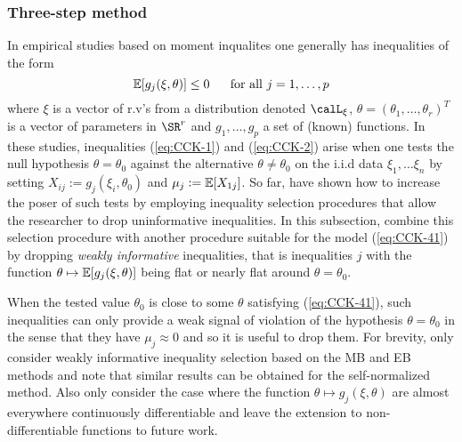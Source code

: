 \subsubsection{Three-step method} 

In empirical studies based on moment inqualites one generally has inequalities of the form 
\begin{equation}
	\label{eq:CCK-41}
	\mathbb{E}[g_j(\xi, \theta)]\leq 0\hbox{ }\hbox{ }\hbox{ }\hbox{ }\text{ for all }j = 1,\dots,p
\end{equation}
where $\xi$ is a vector of r.v's from a distribution denoted $\calL_\xi$, $\theta = (\theta_1, \dots, \theta_r)^T$ is a vector of parameters in $\SR^r$ and $g_1,\dots,g_p$ a set of (known) functions. In these studies, inequalities (\ref{eq:CCK-1}) and (\ref{eq:CCK-2}) arise when one tests the null hypothesis $\theta = \theta_0$ against the alternative $\theta \neq \theta_0$ on the i.i.d data $\xi_1,\dots \xi_n$ by setting $X_{ij} := g_j(\xi_i,\theta_0)$ and $\mu_j := \mathbb{E}[X_{1j}]$. So far, have shown how to increase the poser of such tests by employing inequality selection procedures that allow the researcher to drop uninformative inequalities. In this subsection, combine this selection procedure with another procedure suitable for the model (\ref{eq:CCK-41}) by dropping \textit{weakly informative} inequalities, that is inequalities $j$ with the function $\theta \mapsto \mathbb{E}[g_j(\xi,\theta)]$ being flat or nearly flat around $\theta = \theta_0$. 

When the tested value $\theta_0$ is close to some $\theta$ satisfying (\ref{eq:CCK-41}), such inequalities can only provide a weak signal of violation of the hypothesis $\theta = \theta_0$ in the sense that they have $\mu_j \approx 0$ and so it is useful to drop them. For brevity, only consider weakly informative inequality selection based on the MB and EB methods and note that similar results can be obtained for the self-normalized method. Also only consider the case where the function $\theta \mapsto g_j(\xi,\theta)$ are almost everywhere continuously differentiable and leave the extension to non-differentiable functions to future work. 

